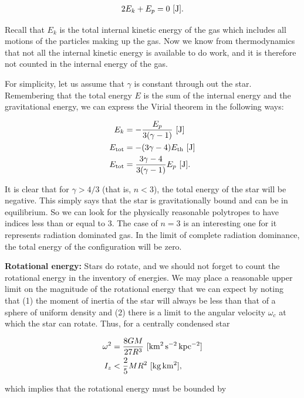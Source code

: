 \documentclass[a4paper,10pt]{article}
\begin{document}
\begin{align*}
    2E_k+E_p = 0 ~ [{\rm J}].
\end{align*}

{\noindent}Recall that $E_k$ is the total internal kinetic energy of the gas which includes all motions of the particles making up the gas. Now we know from thermodynamics that not all the internal kinetic energy is available to do work, and it is therefore not counted in the internal energy of the gas.

{\noindent}For simplicity, let us assume that $\gamma$ is constant through out the star. Remembering that the total energy $E$ is the sum of the internal energy and the gravitational energy, we can express the Virial theorem in the following ways:

\begin{align*}
    E_k &= -\frac{E_p}{3(\gamma-1)} ~ [{\rm J}]\\
    E_{\rm tot} &= -(3\gamma-4)E_{\rm th} ~ [{\rm J}]\\
    E_{\rm tot} &= \frac{3\gamma-4}{3(\gamma-1)}E_p ~ [{\rm J}].
\end{align*}

{\noindent}It is clear that for $\gamma>4/3$ (that is, $n<3$), the total energy of the star will be negative. This simply says that the star is gravitationally bound and can be in equilibrium. So we can look for the physically reasonable polytropes to have indices less than or equal to $3$. The case of $n=3$ is an interesting one for it represents radiation dominated gas. In the limit of complete radiation dominance, the total energy of the configuration will be zero.

{\noindent}\textbf{Rotational energy:} Stars do rotate, and we should not forget to count the rotational energy in the inventory of energies. We may place a reasonable upper limit on the magnitude of the rotational energy that we can expect by noting that (1) the moment of inertia of the star will always be less than that of a sphere of uniform density and (2) there is a limit to the angular velocity $\omega_c$ at which the star can rotate. Thus, for a centrally condensed star

\begin{align*}
    \omega^2 &= \frac{8GM}{27R^3} ~ [{\rm km^2\,s^{-2}\,kpc^{-2}}] \\
    I_z &< \frac{2}{5}MR^2 ~ [{\rm kg\,km^2}],
\end{align*}

{\noindent}which implies that the rotational energy must be bounded by
\end{document}
